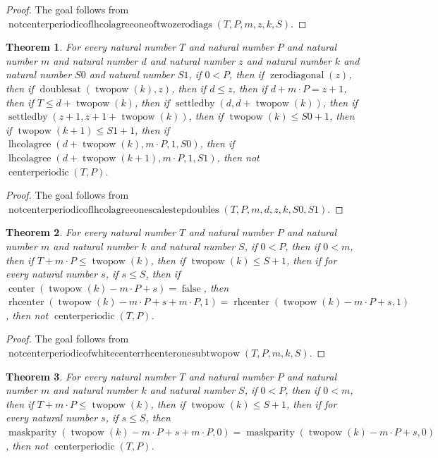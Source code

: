 \documentclass[11pt]{article}
\newtheorem{theorem}{Theorem}[section]
\theoremstyle{definition}
\begin{document}
\begin{proof}
The goal follows from \(\operatorname{notcenterperiodicoflhcolagreeoneoftwozerodiags}(T, P, m, z, k, S)\).
\end{proof}
\begin{theorem}
\label{ll:paper:not-centerperiodic-of-lhcolagree-one-scale-step-doubles}
For every natural number \(T\) and natural number \(P\) and natural number \(m\) and natural number \(d\) and natural number \(z\) and natural number \(k\) and natural number \(S0\) and natural number \(S1\), if \(0 < P\), then if \(\operatorname{zerodiagonal}(z)\), then if \(\operatorname{doublesat}(\operatorname{twopow}(k), z)\), then if \(d \le z\), then if \(d + m \cdot P = z + 1\), then if \(T \le d + \operatorname{twopow}(k)\), then if \(\operatorname{settledby}(d, d + \operatorname{twopow}(k))\), then if \(\operatorname{settledby}(z + 1, z + 1 + \operatorname{twopow}(k))\), then if \(\operatorname{twopow}(k) \le S0 + 1\), then if \(\operatorname{twopow}(k + 1) \le S1 + 1\), then if \(\operatorname{lhcolagree}(d + \operatorname{twopow}(k), m \cdot P, 1, S0)\), then if \(\operatorname{lhcolagree}(d + \operatorname{twopow}(k + 1), m \cdot P, 1, S1)\), then not \(\operatorname{centerperiodic}(T, P)\).
\end{theorem}
\begin{proof}
The goal follows from \(\operatorname{notcenterperiodicoflhcolagreeonescalestepdoubles}(T, P, m, d, z, k, S0, S1)\).
\end{proof}
\begin{theorem}
\label{ll:paper:not-centerperiodic-of-white-center-rhcenter-one-sub-twopow}
For every natural number \(T\) and natural number \(P\) and natural number \(m\) and natural number \(k\) and natural number \(S\), if \(0 < P\), then if \(0 < m\), then if \(T + m \cdot P \le \operatorname{twopow}(k)\), then if \(\operatorname{twopow}(k) \le S + 1\), then if for every natural number \(s\), if \(s \le S\), then if \(\operatorname{center}(\operatorname{twopow}(k) - m \cdot P + s) = \operatorname{false}\), then \(\operatorname{rhcenter}(\operatorname{twopow}(k) - m \cdot P + s + m \cdot P, 1) = \operatorname{rhcenter}(\operatorname{twopow}(k) - m \cdot P + s, 1)\), then not \(\operatorname{centerperiodic}(T, P)\).
\end{theorem}
\begin{proof}
The goal follows from \(\operatorname{notcenterperiodicofwhitecenterrhcenteronesubtwopow}(T, P, m, k, S)\).
\end{proof}
\begin{theorem}
\label{ll:paper:not-centerperiodic-of-maskparity-zero-agree-sub-twopow}
For every natural number \(T\) and natural number \(P\) and natural number \(m\) and natural number \(k\) and natural number \(S\), if \(0 < P\), then if \(0 < m\), then if \(T + m \cdot P \le \operatorname{twopow}(k)\), then if \(\operatorname{twopow}(k) \le S + 1\), then if for every natural number \(s\), if \(s \le S\), then \(\operatorname{maskparity}(\operatorname{twopow}(k) - m \cdot P + s + m \cdot P, 0) = \operatorname{maskparity}(\operatorname{twopow}(k) - m \cdot P + s, 0)\), then not \(\operatorname{centerperiodic}(T, P)\).
\end{theorem}
\end{document}
